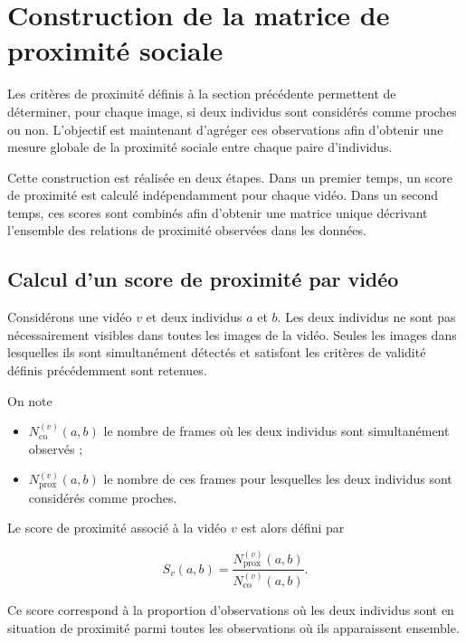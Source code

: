 \documentclass[11pt,a4paper]{report}
\begin{document}
\section{Construction de la matrice de proximité sociale}
\label{sec:construction_matrice}

Les critères de proximité définis à la section précédente permettent de
déterminer, pour chaque image, si deux individus sont considérés comme proches
ou non. L'objectif est maintenant d'agréger ces observations afin d'obtenir une
mesure globale de la proximité sociale entre chaque paire d'individus.

Cette construction est réalisée en deux étapes. Dans un premier temps, un score
de proximité est calculé indépendamment pour chaque vidéo. Dans un second temps,
ces scores sont combinés afin d'obtenir une matrice unique décrivant l'ensemble
des relations de proximité observées dans les données.

\subsection*{Calcul d'un score de proximité par vidéo}

Considérons une vidéo $v$ et deux individus $a$ et $b$. Les deux individus ne
sont pas nécessairement visibles dans toutes les images de la vidéo. Seules les
images dans lesquelles ils sont simultanément détectés et satisfont les critères
de validité définis précédemment sont retenues.

On note

\begin{itemize}
    \item $N_{\mathrm{co}}^{(v)}(a,b)$ le nombre de frames où les deux individus
    sont simultanément observés ;
    \item $N_{\mathrm{prox}}^{(v)}(a,b)$ le nombre de ces frames pour lesquelles
    les deux individus sont considérés comme proches.
\end{itemize}

Le score de proximité associé à la vidéo $v$ est alors défini par

\begin{equation}
S_v(a,b)
=
\frac{
N_{\mathrm{prox}}^{(v)}(a,b)}
{N_{\mathrm{co}}^{(v)}(a,b)}.
\end{equation}

Ce score correspond à la proportion d'observations où les deux individus sont
en situation de proximité parmi toutes les observations où ils apparaissent
ensemble.
\end{document}
